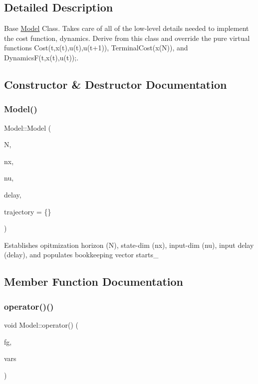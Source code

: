 \subsection{Detailed Description}
Base \mbox{\hyperlink{classModel}{Model}} Class. Takes care of all of the low-\/level details needed to implement the cost function, dynamics. Derive from this class and override the pure virtual functions Cost(t,x(t),u(t),u(t+1)), Terminal\+Cost(x(\+N)), and DynamicsF(t,x(t),u(t));. 

\subsection{Constructor \& Destructor Documentation}
\mbox{\label{classModel_aa480bf5dbdbf89e5221ab1aef113ece0}} 
\subsubsection{\texorpdfstring{Model()}{Model()}}
{\footnotesize\ttfamily Model\+::\+Model (\begin{DoxyParamCaption}\item[{int}]{N,  }\item[{int}]{nx,  }\item[{int}]{nu,  }\item[{int}]{delay,  }\item[{const vector$<$ double $>$ \&}]{trajectory = {\ttfamily \{\}} }\end{DoxyParamCaption})\hspace{0.3cm}{\ttfamily [inline]}}

Establishes opitmization horizon (N), state-\/dim (nx), input-\/dim (nu), input delay (delay), and populates bookkeeping vector starts\+\_\+ 

\subsection{Member Function Documentation}
\mbox{\label{classModel_a138487dfb01ab6af0856c493f20ad179}} 
\subsubsection{\texorpdfstring{operator()()}{operator()()}}
{\footnotesize\ttfamily void Model\+::operator() (\begin{DoxyParamCaption}\item[{A\+D\+Vec \&}]{fg,  }\item[{const A\+D\+Vec \&}]{vars }\end{DoxyParamCaption})\hspace{0.3cm}{\ttfamily [inline]}}


